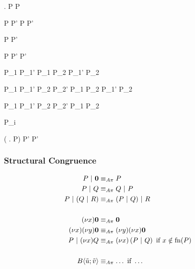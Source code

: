   {  \anullproc}

  { . P  P}

  {P  P'}
  {P  P'}

  {P \apireduction{\alpha} P'}
  { \apireduction{\alpha} }

  {P  P'}
  {  P'}

  {P_1 \apireduction{\alpha} P_1'}
  {P_1 \apar P_2 \apireduction{\alpha} P_1' \apar P_2}

  {P_1  P_1'}
  {P_2  P_2'}
  {P_1 \apar P_2 \apireduction{\actsilent} P_1' \apar P_2}

  {P_1  P_1'}
  {P_2  P_2'}
  {P_1 \apar P_2 \apireduction{\actsilent} }

  { \apireduction{\actsilent} P_i}

  {( . P)
    \apireduction{\alpha} P'}
  { \apireduction{\alpha} P'}



\subsubsection{Structural Congruence}

\begin{align*}
  P \apar \anullproc
    &\astructequ P \\
  P \apar Q
    &\astructequ Q \apar P \\
  P \apar (Q \apar R)
    &\astructequ (P \apar Q) \apar R \\
  \\
  \anew{x}{\anullproc}
    &\astructequ \anullproc \\
  \anew{x}{\anew{y}{\anullproc}}
    &\astructequ \anew{y}{\anew{x}{\anullproc}} \\
  P \apar \anew{x}{Q}
    &\astructequ \anew*{x}{P \apar Q} \text{ if } x \notin \fn{P} \\
  \\
  \ains{B}{\tilde{u}}{\tilde{v}}
    &\astructequ \ldots \text{ if } \ldots %
\end{align*}


